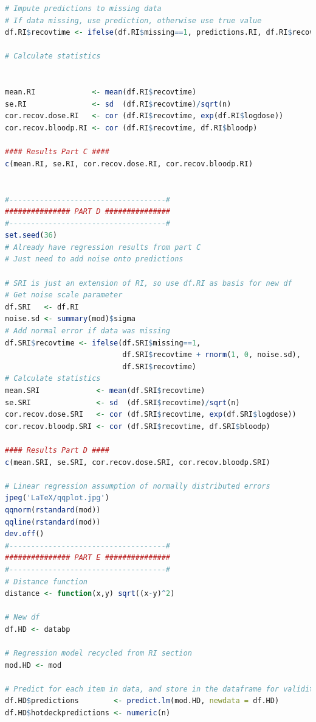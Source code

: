 \documentclass{article}
\numberwithin{equation}{section} %
\begin{document}
\begin{lstlisting}[language=R]
# Impute predictions to missing data
# If data missing, use prediction, otherwise use true value
df.RI$recovtime <- ifelse(df.RI$missing==1, predictions.RI, df.RI$recovtime)

# Calculate statistics


mean.RI             <- mean(df.RI$recovtime)
se.RI               <- sd  (df.RI$recovtime)/sqrt(n)
cor.recov.dose.RI   <- cor (df.RI$recovtime, exp(df.RI$logdose))
cor.recov.bloodp.RI <- cor (df.RI$recovtime, df.RI$bloodp)

#### Results Part C ####
c(mean.RI, se.RI, cor.recov.dose.RI, cor.recov.bloodp.RI)


#------------------------------------#
############### PART D ###############
#------------------------------------#
set.seed(36)
# Already have regression results from part C
# Just need to add noise onto predictions

# SRI is just an extension of RI, so use df.RI as basis for new df
# Get noise scale parameter
df.SRI   <- df.RI
noise.sd <- summary(mod)$sigma
# Add normal error if data was missing
df.SRI$recovtime <- ifelse(df.SRI$missing==1, 
                           df.SRI$recovtime + rnorm(1, 0, noise.sd),
                           df.SRI$recovtime)
# Calculate statistics
mean.SRI             <- mean(df.SRI$recovtime)
se.SRI               <- sd  (df.SRI$recovtime)/sqrt(n)
cor.recov.dose.SRI   <- cor (df.SRI$recovtime, exp(df.SRI$logdose))
cor.recov.bloodp.SRI <- cor (df.SRI$recovtime, df.SRI$bloodp)

#### Results Part D ####
c(mean.SRI, se.SRI, cor.recov.dose.SRI, cor.recov.bloodp.SRI)

# Linear regression assumption of normally distributed errors
jpeg('LaTeX/qqplot.jpg')
qqnorm(rstandard(mod))
qqline(rstandard(mod))
dev.off()
#------------------------------------#
############### PART E ###############
#------------------------------------#
# Distance function
distance <- function(x,y) sqrt((x-y)^2)

# New df
df.HD <- databp

# Regression model recycled from RI section
mod.HD <- mod

# Predict for each item in data, and store in the dataframe for validity checks
df.HD$predictions        <- predict.lm(mod.HD, newdata = df.HD)
df.HD$hotdeckpredictions <- numeric(n)


\end{lstlisting}
\end{document}
